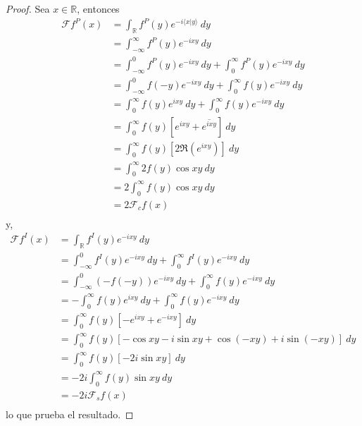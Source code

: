 \documentclass[12pt]{report}
\newcounter{it}
\theoremstyle{largebreak}
\newcommand\pint[2]{\ensuremath{\langle#1| #2\rangle}}
\newcommand\conj[1]{\ensuremath{\overline{#1}}}
\newcommand{\fou}[1]{\ensuremath{\mathcal{F}#1}}
\begin{document}
    \begin{proof}
        Sea $x\in\mathbb{R}$, entonces
        \begin{equation*}
            \begin{split}
                \fou{f^P}(x)&=\int_{\mathbb{R}} f^P(y) e^{ -i\pint{x}{y}} \:dy\\
                &=\int_{-\infty}^\infty f^P(y)e^{-ixy}\:dy\\
                &=\int_{-\infty}^0f^P(y)e^{-ixy}\:dy+\int_0^{\infty}f^P(y)e^{-ixy}\:dy \\
                &=\int_{-\infty}^0f(-y)e^{-ixy}\:dy+\int_0^{\infty}f(y)e^{-ixy}\:dy\\
                &=\int_{0}^\infty f(y)e^{ixy}\:dy+\int_0^{\infty}f(y)e^{-ixy}\:dy\\
                &=\int_{0}^\infty f(y)\left[e^{ixy}+\conj{e^{ixy}}\right] \:dy\\
                &=\int_{0}^\infty f(y)\left[2\Re(e^{ ixy}) \right] \:dy\\
                &=\int_{0}^\infty 2f(y)\cos xy \:dy\\
                &=2\int_{0}^\infty f(y)\cos xy \:dy\\
                &=2\mathcal{F}_cf(x)\\
            \end{split}
        \end{equation*}
        y,
        \begin{equation*}
            \begin{split}
                \fou{f^I}(x)&=\int_{\mathbb{R}}f^I(y)e^{ -ixy}\:dy\\
                &=\int_{-\infty}^0f^I(y)e^{ -ixy}\:dy+\int_{0}^\infty f^I(y)e^{ -ixy}\:dy\\
                &=\int_{-\infty}^0(-f(-y))e^{ -ixy}\:dy+\int_{0}^\infty f(y)e^{ -ixy}\:dy\\
                &=-\int_{0}^\infty f(y)e^{ixy}\:dy+\int_{0}^\infty f(y)e^{ -ixy}\:dy\\
                &=\int_{0}^\infty f(y)\left[-e^{ixy}+e^{-ixy}\right] \:dy\\
                &=\int_{0}^\infty f(y)\left[-\cos xy-i\sin xy+\cos(-xy)+i\sin(-xy)\right] \:dy\\
                &=\int_{0}^\infty f(y)\left[-2i\sin xy\right]\:dy\\
                &=-2i\int_{0}^\infty f(y)\sin xy\:dy\\
                &=-2i\mathcal{F}_sf(x)\\
            \end{split}
        \end{equation*}
        lo que prueba el resultado.
    \end{proof}
\end{document}
